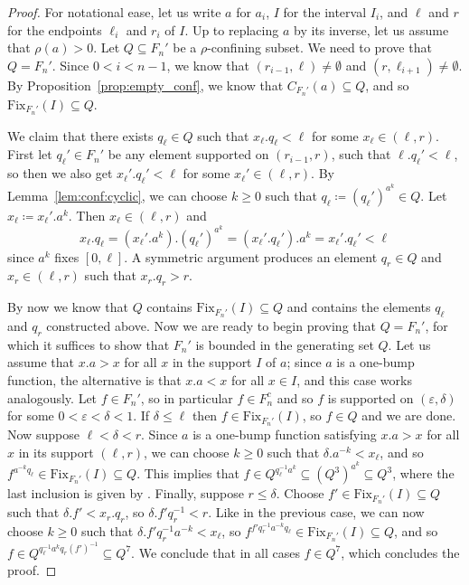 \documentclass[10pt,a4paper]{article}
\theoremstyle{definition}
\theoremstyle{remark}
\newcommand{\Fix}{\mathrm{Fix}}
\theoremstyle{plain}
\begin{document}
\begin{proof}
For notational ease, let us write $a$ for $a_i$, $I$ for the interval $I_i$, and $\ell$ and $r$ for the endpoints $\ell_i$ and $r_i$ of $I$. Up to replacing $a$ by its inverse, let us assume that $\rho(a) > 0$. Let $Q\subseteq F_n'$ be a $\rho$-confining subset. We need to prove that $Q=F_n'$. Since $0<i<n-1$, we know that $(r_{i-1},\ell)\ne\emptyset$ and $(r,\ell_{i+1})\ne\emptyset$. By Proposition~\ref{prop:empty_conf}, we know that $C_{F_n'}(a) \subseteq Q$, and so $\Fix_{F_n'}(I)\subseteq Q$. 

We claim that there exists $q_\ell\in Q$ such that $x_\ell.q_\ell<\ell$ for some $x_\ell\in (\ell,r)$. First let $q_\ell'\in F_n'$ be any element supported on $(r_{i-1},r)$, such that $\ell.q_\ell'<\ell$, so then we also get $x_\ell'.q_\ell'<\ell$ for some $x_\ell'\in (\ell,r)$. By Lemma~\ref{lem:conf:cyclic}, we can choose $k \geq 0$ such that $q_\ell\coloneqq (q_\ell')^{a^k}\in Q$. Let $x_\ell\coloneqq x_\ell'.a^k$. Then $x_\ell\in (\ell,r)$ and
\[
x_\ell.q_\ell = (x_\ell'.a^k).(q_\ell')^{a^k} = (x_\ell'.q_\ell').a^k = x_\ell'.q_\ell'<\ell
\]
since $a^k$ fixes $[0,\ell]$. A symmetric argument produces an element $q_r\in Q$ and $x_r\in(\ell,r)$ such that $x_r.q_r>r$.

By now we know that $Q$ contains $\Fix_{F_n'}(I)\subseteq Q$ and contains the elements $q_\ell$ and $q_r$ constructed above. Now we are ready to begin proving that $Q=F_n'$, for which it suffices to show that $F_n'$ is bounded in the generating set $Q$. Let us assume that $x.a>x$ for all $x$ in the support $I$ of $a$; since $a$ is a one-bump function, the alternative is that $x.a<x$ for all $x\in I$, and this case works analogously. Let $f\in F_n'$, so in particular $f \in F_n^c$ and so $f$ is supported on $(\varepsilon,\delta)$ for some $0<\varepsilon<\delta<1$. If $\delta\le \ell$ then $f\in \Fix_{F_n'}(I)$, so $f\in Q$ and we are done. Now suppose $\ell < \delta < r$. Since $a$ is a one-bump function satisfying $x.a>x$ for all $x$ in its support $(\ell,r)$, we can choose $k\ge 0$ such that $\delta.a^{-k}<x_\ell$, and so $f^{a^{-k}q_\ell}\in \Fix_{F_n'}(I) \subseteq Q$. This implies that $f \in Q^{q_\ell^{-1} a^k} \subseteq (Q^3)^{a^k} \subseteq Q^3$, where the last inclusion is given by \StayInConf. Finally, suppose $r \le \delta$. Choose $f'\in \Fix_{F_n'}(I)\subseteq Q$ such that $\delta.f'<x_r.q_r$, so $\delta.f'q_r^{-1}<r$. Like in the previous case, we can now choose $k\ge 0$ such that $\delta.f'q_r^{-1} a^{-k}<x_\ell$, so $f^{f'q_r^{-1} a^{-k}q_\ell}\in  \Fix_{F_n'}(I) \subseteq Q$, and so $f\in Q^{q_\ell^{-1} a^k q_r (f')^{-1}} \subseteq Q^7$. We conclude that in all cases $f\in Q^7$, which concludes the proof.
\end{proof}
\end{document}
